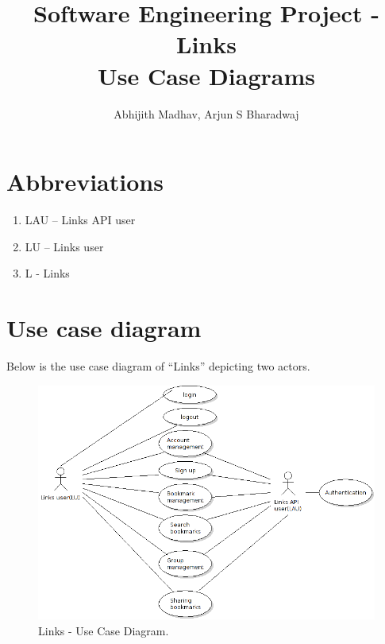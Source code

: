 \documentclass[11pt]{report} %
\title{Software Engineering Project - Links \\Use Case Diagrams}
\author{Abhijith Madhav, Arjun S Bharadwaj}
\begin{document}
\maketitle
\section*{Abbreviations}
\begin{enumerate}
	\item
		LAU – Links API user
	\item
		LU – Links user
	\item
		L - Links
\end{enumerate}

\maketitle
\section*{Use case diagram}
Below is the use case diagram of “Links” depicting two actors.
\begin{figure}[h]
\centering
        \includegraphics[width=\textwidth]{usecase}
    \caption{{Links - Use Case Diagram}.}
    \label{fig:Use Case Diagram}
\end{figure}


\maketitle
\end{document}
